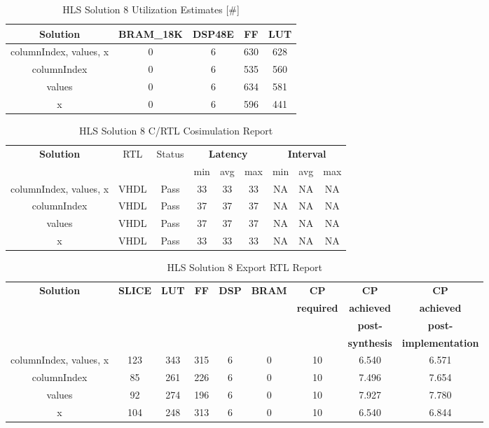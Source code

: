 \begin{table}[H]
	\centering
	\begin{tabular}{|c|c|c|c|c|}
		\hline
		\textbf{Solution} & \textbf{BRAM\_18K} & \textbf{DSP48E} & \textbf{FF} & \textbf{LUT} \\
		\hline
		columnIndex, values, x & 0 & 6 & 630 & 628 \\
		\hline
		columnIndex & 0 & 6 & 535 & 560 \\
		\hline
		values & 0 & 6 & 634 & 581 \\
		\hline
		x & 0 & 6 & 596 & 441 \\
		\hline
	\end{tabular}
	\caption{HLS Solution 8 Utilization Estimates [\#]}
	\label{tab:hls-solution-8-utilization-report}
\end{table}

\begin{table}[H]
	\centering
	\begin{tabular}{|c|c|c|c|c|c|c|c|c|}
		\hline
		\multicolumn{1}{|c|}{\textbf{Solution}} & \multicolumn{1}{|c|}{RTL} & \multicolumn{1}{|c|}{Status} & \multicolumn{3}{c|}{\textbf{Latency}} & \multicolumn{3}{c|}{\textbf{Interval}} \\
		& &  & min & avg & max & min & avg & max \\
		\hline
		columnIndex, values, x & VHDL & Pass & 33 & 33 & 33 & NA & NA & NA \\
		\hline
		columnIndex & VHDL & Pass & 37 & 37 & 37 & NA & NA & NA \\
		\hline
		values & VHDL & Pass & 37 & 37 & 37 & NA & NA & NA \\
		\hline
		x & VHDL & Pass & 33 & 33 & 33 & NA & NA & NA \\
		\hline
	\end{tabular}
	\caption{HLS Solution 8 C/RTL Cosimulation Report }
	\label{tab:hls-solution-8-cosimulation-report}
\end{table}

\begin{table}[H]
	\centering
	\begin{tabular}{|c|c|c|c|c|c|c|c|c|}
		\hline
		\textbf{Solution} & \textbf{SLICE} & \textbf{LUT} & \textbf{FF} & \textbf{DSP} & \textbf{BRAM} & \textbf{CP} & \textbf{CP} & \textbf{CP} \\
		& & & & & & \textbf{required} & \textbf{achieved} & \textbf{achieved}\\
		& & & & & & & \textbf{post-} & \textbf{post-}\\
		& & & & & & & \textbf{synthesis} & \textbf{implementation}\\
		\hline
		columnIndex, values, x  & 123 & 343 & 315 & 6 & 0 & 10 & 6.540 & 6.571 \\
		\hline
		columnIndex  & 85 & 261 & 226 & 6 & 0 & 10 & 7.496 & 7.654 \\
		\hline
		values  & 92 & 274 & 196 & 6 & 0 & 10 & 7.927 & 7.780 \\
		\hline
		x  & 104 & 248 & 313 & 6 & 0 & 10 & 6.540 & 6.844 \\
		\hline
	\end{tabular}
	\caption{HLS Solution 8 Export RTL Report}
	\label{tab:hls-solution-8-export-rtl-report}
\end{table}
